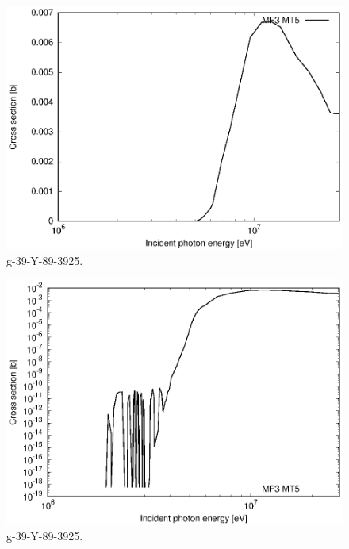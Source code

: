 \begin{figure}
 \includegraphics[width=\linewidth]{eps/g_39-Y-89_3925.eps}
  \caption{g-39-Y-89-3925.}
\end{figure}
\begin{figure}
 \includegraphics[width=\linewidth]{eps-log/g_39-Y-89_3925.eps}
 \caption{g-39-Y-89-3925.}
\end{figure}
\newpage \clearpage

